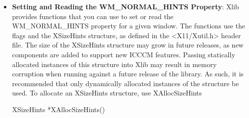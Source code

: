 \documentclass{report}
\begin{document}
\begin{itemize}
\begin{itemize}
\begin{itemize}
                \item $w$ Specifies the window.
                \item wmhints Specifies the XWMHints structure to be used.
            \end{itemize}
            The XSetWMHints function sets the window manager hints that include icon information and location, the initial state of the window, and whether the application relies on the window manager to get keyboard input.
            \bigbreak \noindent 
            XSetWMHints can generate BadAlloc and BadWindow errors. 
            \bigbreak \noindent 
            To read a window’s WM\_HINTS property, use XGetWMHints
            \bigbreak \noindent 
            \begin{cppcode}
                XWMHints *XGetWMHints(display, w)
            \end{cppcode}
            \begin{itemize}
                \item display Specifies the connection to the X server.
                \item $w$ Specifies the window.
            \end{itemize}
            The XGetWMHints function reads the window manager hints and returns NULL if no WM\_HINTS property was set on the window or returns a pointer to an XWMHints structure if it succeeds. When finished with the data, free the space used for it by calling XFree.
            \bigbreak \noindent 
            XGetWMHints can generate a BadWindow error.
        \item \textbf{Setting and Reading the WM\_NORMAL\_HINTS Property}: Xlib provides functions that you can use to set or read the WM\_NORMAL\_HINTS property for a given window. The functions use the flags and the XSizeHints structure, as defined in the <X11/Xutil.h> header file.
            \bigbreak \noindent 
            The size of the XSizeHints structure may grow in future releases, as new components are added to support new ICCCM features. Passing statically allocated instances of this structure into Xlib may result in memory corruption when running against a future release of the library. As such, it is recommended that only dynamically allocated instances of the structure be used.
            \bigbreak \noindent 
            To allocate an XSizeHints structure, use XAllocSizeHints
            \bigbreak \noindent 
            \begin{cppcode}
                XSizeHints *XAllocSizeHints()
            \end{cppcode}

\end{itemize}
\end{itemize}
\end{document}
